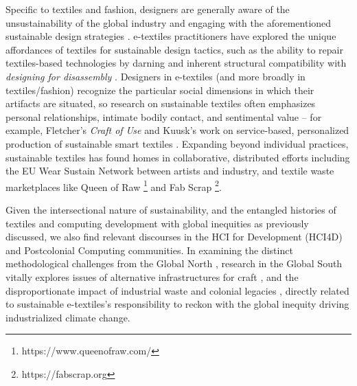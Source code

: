 Specific to textiles and fashion, designers are generally aware of the unsustainability of the global industry and engaging with the aforementioned sustainable design strategies \cite{brydges_closing_2021, kohler_challenges_2013, veske_review_2020}. e-textiles practitioners have explored the unique affordances of textiles for sustainable design tactics, such as the ability to repair textiles-based technologies by darning \cite{jones_e-darning_2021} and inherent structural compatibility with \textit{designing for disassembly} \cite{wu_unfabricate_2020}. Designers in e-textiles (and more broadly in textiles/fashion) recognize the particular social dimensions in which their artifacts are situated, so research on sustainable textiles often emphasizes personal relationships, intimate bodily contact, and sentimental value -- for example, Fletcher's \textit{Craft of Use} \cite{fletcher_craft_2016} and Kuusk's work on service-based, personalized production of sustainable smart textiles \cite{kuusk_crafting_2015}. Expanding beyond individual practices, sustainable textiles has found homes in collaborative, distributed efforts including the EU Wear Sustain Network \cite{goodman_wear_2018} between artists and industry, and textile waste marketplaces like Queen of Raw \footnote{https://www.queenofraw.com/} and Fab Scrap \footnote{https://fabscrap.org}.





Given the intersectional nature of sustainability, and the entangled histories of textiles and computing development with global inequities as previously discussed, we also find relevant discourses in the HCI for Development (HCI4D) and Postcolonial Computing communities. In examining the distinct methodological challenges from the Global North \cite{chetty_hci4d_2007}, research in the Global South vitally explores issues of alternative infrastructures for craft \cite{jack_infrastructure_2017, zhang_designing_2019}, and the disproportionate impact of industrial waste \cite{rifat_breaking_2019} and colonial legacies \cite{philip_postcolonial_2012, irani_postcolonial_2010}, directly related to sustainable e-textiles's responsibility to reckon with the global inequity driving industrialized climate change.


